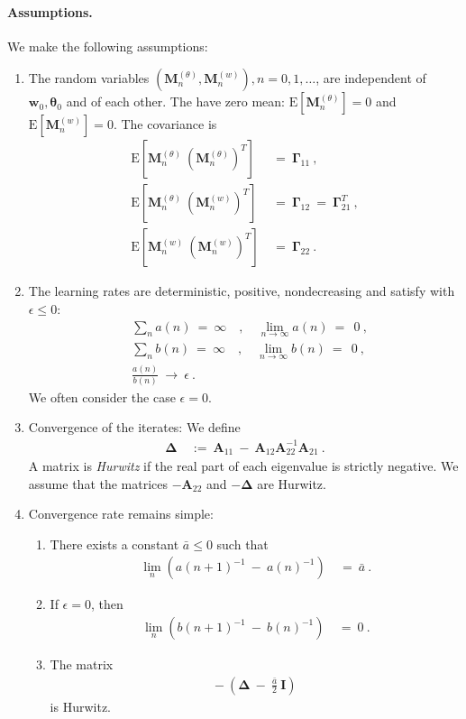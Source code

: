 \documentclass{article}
\newcommand\Bw{\bm{w}}
\newcommand\BA{\bm{A}}
\newcommand\BI{\bm{I}}
\newcommand\BM{\bm{M}}
\newcommand\Bth{\bm{\theta}}
\newcommand\BDe{\bm{\Delta}}
\newcommand\BGa{\bm{\Gamma}}
\newcommand{\rE}{\mathrm{E}} \newcommand{\rF}{\mathrm{F}}
\renewcommand{\leq}{\leqslant}
\begin{document}
\paragraph{Assumptions.}
We make the following assumptions:
\begin{enumerate}[label=\textbf{(A\arabic*)}]
\item The random variables $(\BM^{(\theta)}_{n},\BM^{(w)}_{n}),
  n=0,1,\ldots$, are independent of $\Bw_0,\Bth_0$ and of each other.
The have zero mean: $\rE[\BM^{(\theta)}_{n}]=0$ and
$\rE[\BM^{(w)}_{n}]=0$. The covariance is
\begin{align}
\rE \left[ \BM^{(\theta)}_{n}\ (\BM^{(\theta)}_{n})^T\right]
\ &= \ \BGa_{11} \ , \\
\rE \left[ \BM^{(\theta)}_{n}\ (\BM^{(w)}_{n})^T\right]
\ &= \ \BGa_{12} \ = \ \BGa_{21}^{T} \ , \\
\rE \left[ \BM^{(w)}_{n}\ (\BM^{(w)}_{n})^T\right]
\ &= \ \BGa_{22} \ .
\end{align}

\item The learning rates are deterministic, positive, nondecreasing
  and satisfy with $\epsilon \leq 0$:
\begin{align}
&\sum_{n} a(n) \ = \ \infty \quad , \quad
\lim_{n \to \infty} a(n) \ = \ \ 0 \ , \\
&\sum_{n} b(n) \ = \ \infty \quad , \quad
\lim_{n \to \infty} b(n) \ = \ \ 0 \ , \\
& \frac{a(n)}{b(n)} \ \to \ \epsilon \ .
\end{align}
We often consider the case $\epsilon=0$.

\item Convergence of the iterates:
We define
\begin{align}
\BDe \ &:= \ \BA_{11} \ - \ \BA_{12} \BA_{22}^{-1} \BA_{21} \ .
\end{align}
A matrix is {\em Hurwitz} if the real part of each eigenvalue is strictly
negative.
We assume that the matrices $-\BA_{22}$ and $-\BDe$ are Hurwitz.



\item Convergence rate remains simple:

\begin{enumerate}
\item
There exists a constant $\bar{a} \leq 0$ such that
\begin{align}
\lim_{n}(a(n+1)^{-1} \ - \ a(n)^{-1}) \ &= \ \bar{a} \ .
\end{align}
\item
If $\epsilon=0$, then
\begin{align}
\lim_{n}(b(n+1)^{-1} \ - \ b(n)^{-1}) \ &= \ 0 \ .
\end{align}
\item
The matrix
\begin{align}
- \ \left( \BDe \ - \ \frac{\bar{a}}{2} \ \BI \right)
\end{align}
is Hurwitz.
\end{enumerate}

\end{enumerate}
\end{document}
